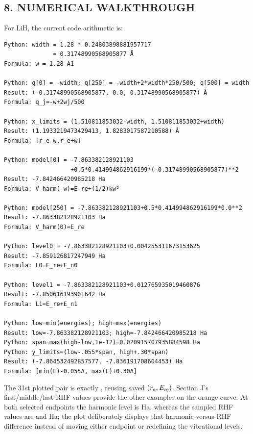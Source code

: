 \documentclass[10pt,a4paper]{article}
\begin{document}
\subsection{8. NUMERICAL WALKTHROUGH}
For LiH, the current code arithmetic is:

\begin{Verbatim}
Python: width = 1.28 * 0.24803898881957717
              = 0.31748990568905877 Å
Formula: w = 1.28 A1

Python: q[0] = -width; q[250] = -width+2*width*250/500; q[500] = width
Result: (-0.31748990568905877, 0.0, 0.31748990568905877) Å
Formula: q_j=-w+2wj/500

Python: x_limits = (1.510811853032-width, 1.510811853032+width)
Result: (1.1933219473429413, 1.8283017587210588) Å
Formula: [r_e-w,r_e+w]

Python: model[0] = -7.863382128921103
                   +0.5*0.414994862916199*(-0.31748990568905877)**2
Result: -7.842466420985218 Ha
Formula: V_harm(-w)=E_re+(1/2)kw²

Python: model[250] = -7.863382128921103+0.5*0.414994862916199*0.0**2
Result: -7.863382128921103 Ha
Formula: V_harm(0)=E_re

Python: level0 = -7.863382128921103+0.004255311673153625
Result: -7.859126817247949 Ha
Formula: L0=E_re+E_n0

Python: level1 = -7.863382128921103+0.012765935019460876
Result: -7.850616193901642 Ha
Formula: L1=E_re+E_n1

Python: low=min(energies); high=max(energies)
Result: low=-7.863382128921103; high=-7.842466420985218 Ha
Python: span=max(high-low,1e-12)=0.020915707935884598 Ha
Python: y_limits=(low-.055*span, high+.30*span)
Result: (-7.864532492857577, -7.836191708604453) Ha
Formula: [min(E)-0.055Δ, max(E)+0.30Δ]
\end{Verbatim}
The 31st plotted pair is exactly , reusing saved \((r_e,E_{\rm re})\). Section J's first/middle/last RHF values provide the other examples on the orange curve. At both selected endpoints the harmonic level is  Ha, whereas the sampled RHF values are  and  Ha; the plot deliberately displays that harmonic-versus-RHF difference instead of moving either endpoint or redefining the vibrational levels.
\end{document}
